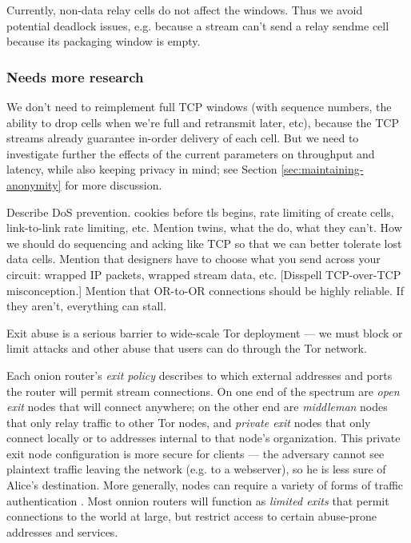 \documentclass[times,10pt,twocolumn]{article}
\begin{document}
Currently, non-data relay cells do not affect the windows. Thus we
avoid potential deadlock issues, e.g. because a stream can't send a
relay sendme cell because its packaging window is empty.

\subsubsection{Needs more research}

We don't need to reimplement full TCP windows (with sequence numbers,
the ability to drop cells when we're full and retransmit later, etc),
because the TCP streams already guarantee in-order delivery of each
cell. But we need to investigate further the effects of the current
parameters on throughput and latency, while also keeping privacy in mind;
see Section \ref{sec:maintaining-anonymity} for more discussion.


\label{subsec:dos}

Describe DoS prevention. cookies before tls begins, rate limiting of
create cells, link-to-link rate limiting, etc.
Mention twins, what the do, what they can't.
How we should do sequencing and acking like TCP so that we can better
tolerate lost data cells.
Mention that designers have to choose what you send across your
  circuit: wrapped IP packets, wrapped stream data, etc.  [Disspell
  TCP-over-TCP misconception.]
Mention that OR-to-OR connections should be highly reliable.  If
  they aren't, everything can stall.

\label{subsec:exitpolicies}

Exit abuse is a serious barrier to wide-scale Tor deployment --- we
must block or limit attacks and other abuse that users can do through
the Tor network.

Each onion router's \emph{exit policy} describes to which external
addresses and ports the router will permit stream connections. On one end
of the spectrum are \emph{open exit} nodes that will connect anywhere;
on the other end are \emph{middleman} nodes that only relay traffic to
other Tor nodes, and \emph{private exit} nodes that only connect locally
or to addresses internal to that node's organization. 
This private exit
node configuration is more secure for clients --- the adversary cannot
see plaintext traffic leaving the network (e.g. to a webserver), so he
is less sure of Alice's destination. More generally, nodes can require
a variety of forms of traffic authentication \cite{onion-discex00}.
Most onnion routers will function as \emph{limited exits} that permit
connections to the world at large, but restrict access to certain abuse-prone
addresses and services.
\end{document}
